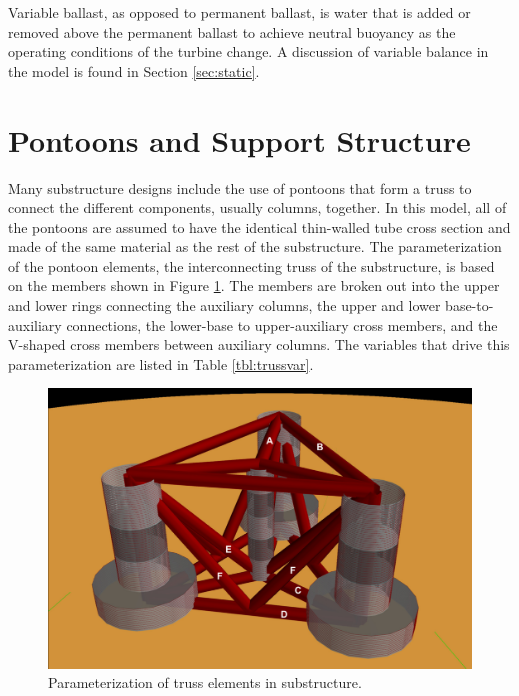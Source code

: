 Variable ballast, as opposed to permanent ballast, is water that is
added or removed above the permanent ballast to achieve neutral buoyancy as the
operating conditions of the turbine change.  A discussion of variable
balance in the model is found in Section \ref{sec:static}.

\section{Pontoons and Support Structure}
Many substructure designs include the use of pontoons that form a truss
to connect the different components, usually columns, together.  In this
model, all of the pontoons are assumed to have the identical thin-walled
tube cross section and made of the same material as the rest of the
substructure.  The parameterization of the pontoon elements, the interconnecting truss
of the substructure, is based on the members shown in Figure
\ref{fig:pontoon}.  The members are broken out into the upper and lower
rings connecting the auxiliary columns, the upper and lower
base-to-auxiliary connections, the lower-base to upper-auxiliary cross
members, and the V-shaped cross members between auxiliary columns.  The
variables that drive this parameterization are listed in Table
\ref{tbl:trussvar}.

\begin{figure}
  \begin{center}
    \includegraphics[width=4.5in]{figs/semi}
    \caption{Parameterization of truss elements in substructure.}
    \label{fig:pontoon}
  \end{center}
\end{figure}

